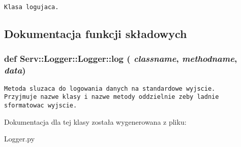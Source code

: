\footnotesize\begin{verbatim}Klasa logujaca.\end{verbatim}
\normalsize
 

\subsection{Dokumentacja funkcji składowych}
\hypertarget{class_serv_1_1_logger_1_1_logger_03728c5f5817396e373bde7861b69d69}{
\subsubsection[{log}]{\setlength{\rightskip}{0pt plus 5cm}def {\bf Serv::Logger::Logger::log} ( {\em classname}, \/   {\em methodname}, \/   {\em data})}}
\label{class_serv_1_1_logger_1_1_logger_03728c5f5817396e373bde7861b69d69}




\footnotesize\begin{verbatim}Metoda sluzaca do logowania danych na standardowe wyjscie.
Przyjmuje nazwe klasy i nazwe metody oddzielnie zeby ladnie sformatowac wyjscie.
\end{verbatim}
\normalsize
 

Dokumentacja dla tej klasy została wygenerowana z pliku:\begin{CompactItemize}
\item 
Logger.py\end{CompactItemize}
